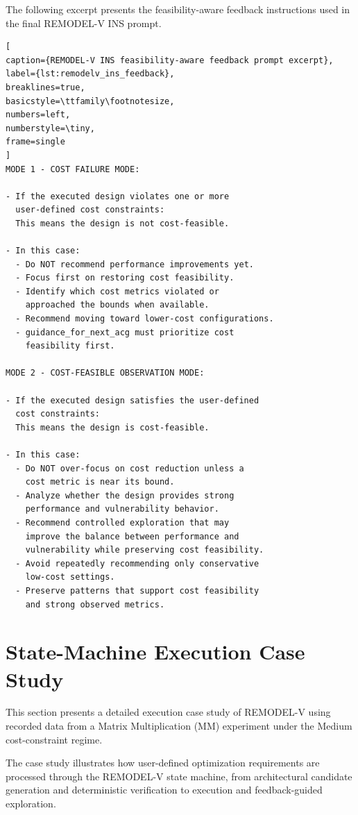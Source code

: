The following excerpt presents the feasibility-aware
feedback instructions used in the final REMODEL-V
INS prompt.

\begin{lstlisting}[
caption={REMODEL-V INS feasibility-aware feedback prompt excerpt},
label={lst:remodelv_ins_feedback},
breaklines=true,
basicstyle=\ttfamily\footnotesize,
numbers=left,
numberstyle=\tiny,
frame=single
]
MODE 1 - COST FAILURE MODE:

- If the executed design violates one or more
  user-defined cost constraints:
  This means the design is not cost-feasible.

- In this case:
  - Do NOT recommend performance improvements yet.
  - Focus first on restoring cost feasibility.
  - Identify which cost metrics violated or
    approached the bounds when available.
  - Recommend moving toward lower-cost configurations.
  - guidance_for_next_acg must prioritize cost
    feasibility first.

MODE 2 - COST-FEASIBLE OBSERVATION MODE:

- If the executed design satisfies the user-defined
  cost constraints:
  This means the design is cost-feasible.

- In this case:
  - Do NOT over-focus on cost reduction unless a
    cost metric is near its bound.
  - Analyze whether the design provides strong
    performance and vulnerability behavior.
  - Recommend controlled exploration that may
    improve the balance between performance and
    vulnerability while preserving cost feasibility.
  - Avoid repeatedly recommending only conservative
    low-cost settings.
  - Preserve patterns that support cost feasibility
    and strong observed metrics.
\end{lstlisting}




\section{State-Machine Execution Case Study}
\label{app:state_machine_case_study}

This section presents a detailed
execution case study of REMODEL-V
using recorded data from a Matrix
Multiplication (MM) experiment
under the Medium cost-constraint
regime.

The case study illustrates how
user-defined optimization requirements
are processed through the REMODEL-V
state machine, from architectural
candidate generation and deterministic
verification to execution and
feedback-guided exploration.


